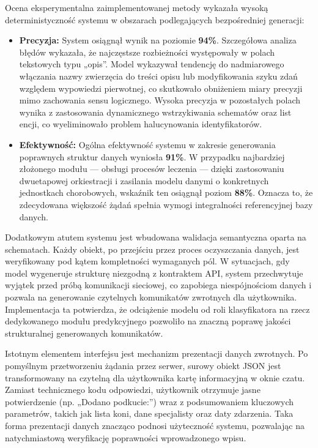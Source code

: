 Ocena eksperymentalna zaimplementowanej metody wykazała wysoką deterministyczność systemu w obszarach podlegających bezpośredniej generacji:

\begin{itemize}
    \item \textbf{Precyzja:} System osiągnął wynik na poziomie \textbf{94\%}. Szczegółowa analiza błędów wykazała, że najczęstsze rozbieżności występowały w polach tekstowych typu „opis”. Model wykazywał tendencję do nadmiarowego włączania nazwy zwierzęcia do treści opisu lub modyfikowania szyku zdań względem wypowiedzi pierwotnej, co skutkowało obniżeniem miary precyzji mimo zachowania sensu logicznego. Wysoka precyzja w pozostałych polach wynika z zastosowania dynamicznego wstrzykiwania schematów oraz list encji, co wyeliminowało problem halucynowania identyfikatorów.
    \item \textbf{Efektywność:} Ogólna efektywność systemu w zakresie generowania poprawnych struktur danych wyniosła \textbf{91\%}. W przypadku najbardziej złożonego modułu — obsługi procesów leczenia — dzięki zastosowaniu dwuetapowej orkiestracji i zasilania modelu danymi o konkretnych jednostkach chorobowych, wskaźnik ten osiągnął poziom \textbf{88\%}. Oznacza to, że zdecydowana większość żądań spełnia wymogi integralności referencyjnej bazy danych.
\end{itemize}

Dodatkowym atutem systemu jest wbudowana walidacja semantyczna oparta na schematach. Każdy obiekt, po przejściu przez proces oczyszczania danych, jest weryfikowany pod kątem kompletności wymaganych pól. W sytuacjach, gdy model wygeneruje strukturę niezgodną z kontraktem API, system przechwytuje wyjątek przed próbą komunikacji sieciowej, co zapobiega niespójnościom danych i pozwala na generowanie czytelnych komunikatów zwrotnych dla użytkownika. Implementacja ta potwierdza, że odciążenie modelu od roli klasyfikatora na rzecz dedykowanego modułu predykcyjnego pozwoliło na znaczną poprawę jakości strukturalnej generowanych komunikatów.

Istotnym elementem interfejsu jest mechanizm prezentacji danych zwrotnych. Po pomyślnym przetworzeniu żądania przez serwer, surowy obiekt JSON jest transformowany na czytelną dla użytkownika kartę informacyjną w oknie czatu. Zamiast technicznego kodu odpowiedzi, użytkownik otrzymuje jasne potwierdzenie (np. „Dodano podkucie:”) wraz z podsumowaniem kluczowych parametrów, takich jak lista koni, dane specjalisty oraz daty zdarzenia. Taka forma prezentacji danych znacząco podnosi użyteczność systemu, pozwalając na natychmiastową weryfikację poprawności wprowadzonego wpisu.

